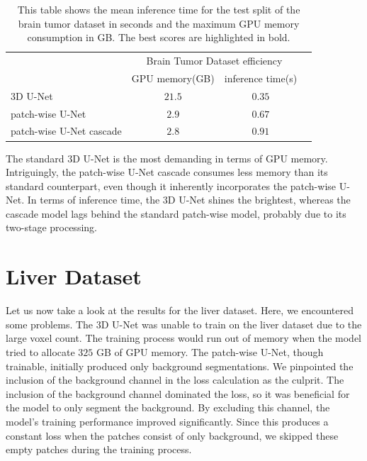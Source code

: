 \begin{table}[ht!]
\begin{center} {\footnotesize
\begin{tabular}{lccc}
\hline
	& \multicolumn{2}{c}{Brain Tumor Dataset efficiency} \\
	& \multicolumn{1}{c}{GPU memory(GB)} & \multicolumn{1}{c}{inference time(s)} \\
\hline
$3$D U-Net & $21.5$ & $\mathbf{0.35}$ \\[1ex]
patch-wise U-Net & $2.9$ & $0.67$ \\[1ex]
patch-wise U-Net cascade & $\mathbf{2.8}$ & $0.91$\\[1ex]
\hline
\end{tabular} }
\end{center}
\caption{\footnotesize This table shows the mean inference time for the test split of the brain tumor dataset in seconds and the maximum GPU memory consumption in GB.
The best scores are highlighted in bold.}
\label{tab:bt-efficiency}
\end{table}

\noindent The standard $3$D U-Net is the most demanding in terms of GPU memory. Intriguingly, the patch-wise U-Net cascade consumes less memory than its standard counterpart,
even though it inherently incorporates the patch-wise U-Net. In terms of inference time, the $3$D U-Net shines the brightest, whereas the cascade model lags behind the standard patch-wise model, probably due to its two-stage processing.

\section{Liver Dataset}
Let us now take a look at the results for the liver dataset. Here, we encountered some problems. The $3$D U-Net was unable to train on the liver dataset due to the large voxel count.
The training process would run out of memory when the model tried to allocate $325$ GB of GPU memory.
The patch-wise U-Net, though trainable, initially produced only background segmentations.
We pinpointed the inclusion of the background channel in the loss calculation as the culprit. The inclusion of the background channel dominated the loss, so it was beneficial for the model to only segment the background. By excluding this channel,
the model's training performance improved significantly. Since this produces a constant loss when the patches consist of only background, we skipped these empty patches during the training process.

